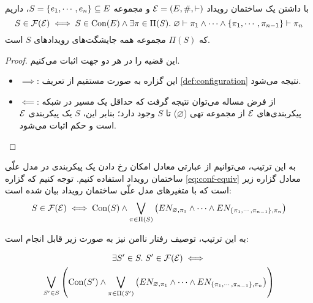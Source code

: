 \begin{theorem}\label{th:conf-equiv}
  با داشتن یک ساختمان رویداد
  $\mathcal{E}=(E,\#,\vdash)$
  و مجموعه
  $S = \left\{ e_1,\cdots,e_n \right\} \subseteq E$،
  داریم
  \begin{equation}\label{eq:conf-equiv}
    S \in \operatorname{\mathcal{F}}(\mathcal{E}) \iff
    S \in \operatorname{Con}(E)
    \wedge \exists \pi \in \Pi(S).\;
    \varnothing \vdash \pi_1 \wedge \cdots \wedge
    \left\{ \pi_1,\cdots,\pi_{n-1} \right\} \vdash \pi_n
  \end{equation}
  که
  $\Pi(S)$
  مجموعه همه جایشگت‌های رویدادهای
  $S$
  است.
\end{theorem}

\begin{proof}
  این قضیه را در هر دو جهت اثبات می‌کنیم.
  \begin{itemize}
    \item $\implies$:
    این گزاره به صورت مستقیم از تعریف
    \ref{def:configuration}
    نتیجه می‌شود.
    \item $\impliedby$:
    از فرض مساله می‌توان نتیجه گرفت که حداقل
    یک مسیر در شبکه پیکربندی‌های
    $\mathcal{E}$
    از مجموعه تهی
    ($\varnothing$)
    تا $S$
    وجود دارد؛ بنابر این،
    $S$
    یک پیکربندی
    $\mathcal{E}$
    است و حکم اثبات می‌شود.
  \end{itemize}
\end{proof}

به این ترتیب، می‌توانیم از عبارتی معادل
امکان رخ دادن یک پیکربندی در مدل علّی ساختمان رویداد
استفاده کنیم. توجه کنیم که گزاره
\ref{eq:conf-equiv}
معادل گزاره زیر است که با متغیرهای مدل علّی
ساختمان رویداد بیان شده است:
\begin{equation}\label{eq:conf-equiv-cm}
  S \in \operatorname{\mathcal{F}}(\mathcal{E}) \iff
  \operatorname{Con}(S) \wedge
  \bigvee_{\pi \in \Pi(S)} \left(
    EN_{\varnothing, \pi_1} \wedge \cdots \wedge
    EN_{\left\{ \pi_1,\cdots,\pi_{n-1} \right\}, \pi_n}
  \right)
\end{equation}

به این ترتیب، توصیف رفتار ناامن نیز به صورت زیر قابل انجام است:

\begin{multline}\label{eq:unsafe-behavior-equiv-cm}
  \exists S' \in S.\;S'\in \operatorname{\mathcal{F}}(\mathcal{E}) \iff \\
  \bigvee_{S' \in S} \left(
    \operatorname{Con}(S') \wedge
    \bigvee_{\pi \in \Pi(S')} \left(
      EN_{\varnothing, \pi_1} \wedge \cdots \wedge
      EN_{\left\{ \pi_1,\cdots,\pi_{n-1} \right\}, \pi_n}
    \right)
  \right)
\end{multline}
